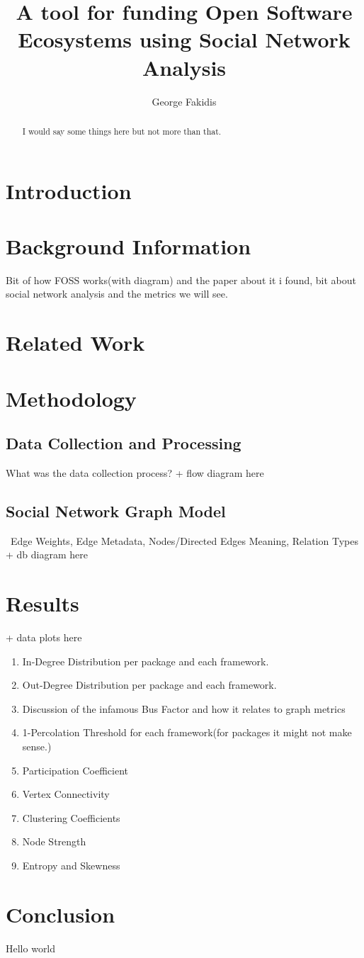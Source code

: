\documentclass{article}
\author{George Fakidis}
\title{A tool for funding Open Software Ecosystems using Social Network Analysis}
\begin{document}
\maketitle
\begin{abstract}
	I would say some things here but not more than that.
\end{abstract}
\section{Introduction}


\section{Background Information}
Bit of how FOSS works(with diagram) and the paper about it i found, bit about social network analysis and the metrics we will see.
\section{Related Work}
\section{Methodology}

\subsection{Data Collection and Processing}
What was the data collection process?
+ flow diagram here
\subsection{Social Network Graph Model}\
Edge Weights, Edge Metadata, Nodes/Directed Edges Meaning, Relation Types
+ db diagram here
\section{Results}
+ data plots here

\begin{enumerate}

	\item{In-Degree Distribution per package and each framework.}
	\item{Out-Degree Distribution per package and each framework.}
	\item{Discussion of the infamous Bus Factor and how it relates to graph metrics}
	\item{1-Percolation Threshold for each framework(for packages it might not make sense.)}
	\item{Participation Coefficient}
	\item{Vertex Connectivity}
	\item{Clustering Coefficients}
	\item{Node Strength}
	\item{Entropy and Skewness}
\end{enumerate}
\section{Conclusion}


Hello world
\end{document}
